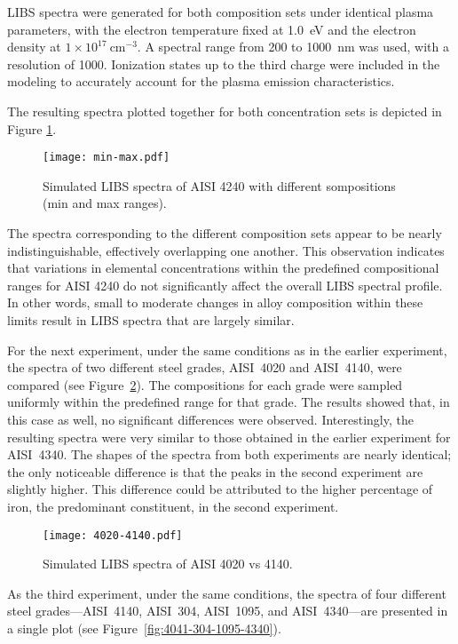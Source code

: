 \documentclass[12pt,a4paper]{article}
\begin{document}
	
	LIBS spectra were generated for both composition sets under identical plasma parameters, with the electron temperature fixed at 1.0~eV and the electron density at $1 \times 10^{17}~\text{cm}^{-3}$. A spectral range from 200 to 1000~nm was used, with a resolution of 1000. Ionization states up to the third charge were included in the modeling to accurately account for the plasma emission characteristics.
	
	The resulting spectra plotted together for both concentration sets is depicted in Figure \ref{fig:min-max}.
	
	
	
	\begin{figure}[h!]
		\centering
		\texttt{[image: min-max.pdf]}
		\caption{Simulated LIBS spectra of AISI 4240 with different sompositions (min and max ranges).}
		\label{fig:min-max}
	\end{figure} 
	The spectra corresponding to the different composition sets appear to be nearly indistinguishable, effectively overlapping one another. This observation indicates that variations in elemental concentrations within the predefined compositional ranges for AISI 4240 do not significantly affect the overall LIBS spectral profile. In other words, small to moderate changes in alloy composition within these limits result in LIBS spectra that are largely similar.
	
	For the next experiment, under the same conditions as in the earlier experiment, the spectra of two different steel grades, AISI~4020 and AISI~4140, were compared (see Figure~\ref{fig:4020-4140}). The compositions for each grade were sampled uniformly within the predefined range for that grade. The results showed that, in this case as well, no significant differences were observed. Interestingly, the resulting spectra were very similar to those obtained in the earlier experiment for AISI~4340. The shapes of the spectra from both experiments are nearly identical; the only noticeable difference is that the peaks in the second experiment are slightly higher. This difference could be attributed to the higher percentage of iron, the predominant constituent, in the second experiment.
	
	
	\begin{figure}[h!]
		\centering
		\texttt{[image: 4020-4140.pdf]}
		\caption{Simulated LIBS spectra of AISI 4020 vs 4140.}
		\label{fig:4020-4140}
	\end{figure} 

	As the third experiment, under the same conditions, the spectra of four different steel grades—AISI~4140, AISI~304, AISI~1095, and AISI~4340—are presented in a single plot (see Figure~\ref{fig:4041-304-1095-4340}). 
	
\end{document}
